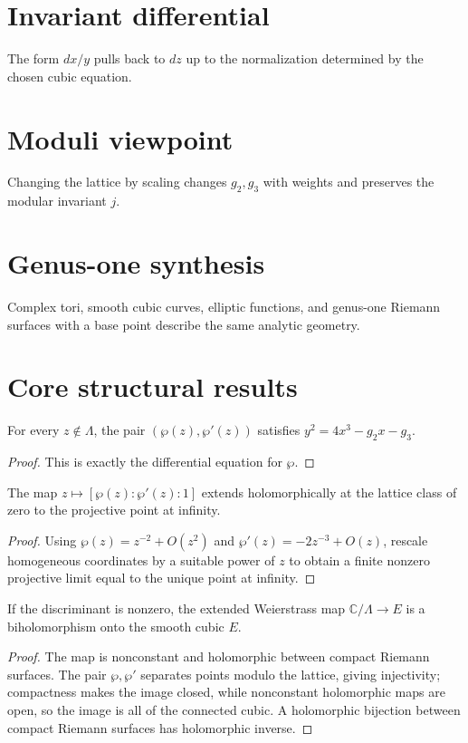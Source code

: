 \section{Invariant differential}
The form $dx/y$ pulls back to $dz$ up to the normalization determined by the chosen cubic equation.

\section{Moduli viewpoint}
Changing the lattice by scaling changes $g_2,g_3$ with weights and preserves the modular invariant $j$.

\section{Genus-one synthesis}
Complex tori, smooth cubic curves, elliptic functions, and genus-one Riemann surfaces with a base point describe the same analytic geometry.

\section{Core structural results}

\begin{theorem}\label{thm:iv31-01}
For every $z\notin\Lambda$, the pair $(\wp(z),\wp'(z))$ satisfies $y^2=4x^3-g_2x-g_3$.
\begin{proof}
This is exactly the differential equation for $\wp$.
\end{proof}
\end{theorem}

\begin{theorem}\label{thm:iv31-02}
The map $z\mapsto[\wp(z):\wp'(z):1]$ extends holomorphically at the lattice class of zero to the projective point at infinity.
\begin{proof}
Using $\wp(z)=z^{-2}+O(z^2)$ and $\wp'(z)=-2z^{-3}+O(z)$, rescale homogeneous coordinates by a suitable power of $z$ to obtain a finite nonzero projective limit equal to the unique point at infinity.
\end{proof}
\end{theorem}

\begin{theorem}\label{thm:iv31-03}
If the discriminant is nonzero, the extended Weierstrass map $\mathbb C/\Lambda\to E$ is a biholomorphism onto the smooth cubic $E$.
\begin{proof}
The map is nonconstant and holomorphic between compact Riemann surfaces. The pair $\wp,\wp'$ separates points modulo the lattice, giving injectivity; compactness makes the image closed, while nonconstant holomorphic maps are open, so the image is all of the connected cubic. A holomorphic bijection between compact Riemann surfaces has holomorphic inverse.
\end{proof}
\end{theorem}

